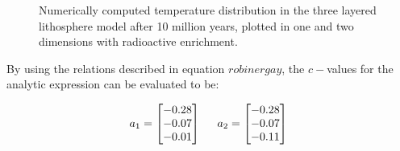 \documentclass[10pt,a4paper]{article}
\begin{document}
\begin{figure} [H]
	\centering
	\caption{\label{10enriched}Numerically computed temperature distribution in the three layered lithosphere model after 10 million years, plotted in one and two dimensions with radioactive enrichment. }
\end{figure}


\noindent By using the relations described in equation $robinergay$, the $c-$values for the analytic expression can be evaluated to be:

\begin{equation}
a_1=\begin{bmatrix}
-0.28\\
-0.07\\
-0.01\\
\end{bmatrix}\\
\hspace{0.5cm}
a_2=\begin{bmatrix}
-0.28\\
-0.07\\
-0.11\\
\end{bmatrix}\\
\vspace{0.5cm}
\end{equation}
\end{document}
